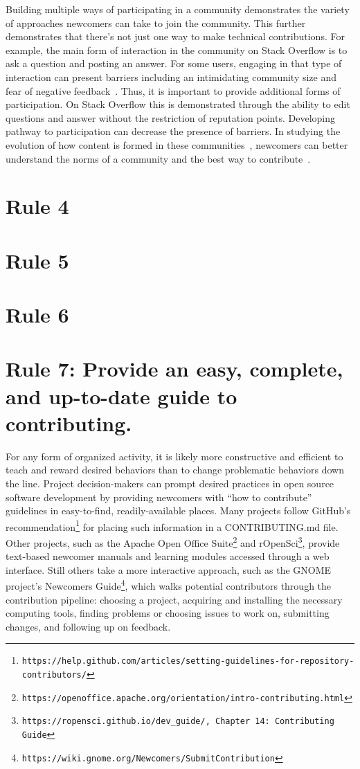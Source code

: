 \documentclass[10pt,letterpaper]{article}
\newcommand{\rulemajor}[1]{\section{#1}}
\newcommand{\withurl}[2]{{#1}\footnote{{\texttt{#2}}}}
\begin{document}
Building multiple ways of participating in a community demonstrates the variety of approaches newcomers can take to join the community.
This further demonstrates that there’s not just one way to make technical contributions.
For example,
the main form of interaction in the community on Stack Overflow is to ask a question and posting an answer.
For some users, engaging in that type of interaction can present barriers including an intimidating community size and fear of negative feedback~\cite{ford2016}.
Thus, it is important to provide additional forms of participation.
On Stack Overflow this is demonstrated through the ability to edit questions and answer without the restriction of reputation points.
Developing pathway to participation can decrease the presence of barriers.
In studying the evolution of how content is formed in these communities~\cite{baltes2018},
newcomers can better understand the norms of a community and the best way to contribute~\cite{ford2018}.

\rulemajor{Rule 4}

\rulemajor{Rule 5}

\rulemajor{Rule 6}

\rulemajor{Rule 7: Provide an easy, complete, and up-to-date guide to contributing.}

For any form of organized activity,
it is likely more constructive and efficient to teach and reward desired behaviors
than to change problematic behaviors down the line.
Project decision-makers can prompt desired practices in open source software development
by providing newcomers with ``how to contribute'' guidelines in easy-to-find, readily-available places.
Many projects follow \withurl{GitHub's recommendation}{https://help.github.com/articles/setting-guidelines-for-repository-contributors/}
for placing such information in a CONTRIBUTING.md file.
Other projects,
such as the \withurl{Apache Open Office Suite}{https://openoffice.apache.org/orientation/intro-contributing.html}
and \withurl{rOpenSci}{https://ropensci.github.io/dev\_guide/, Chapter 14: Contributing Guide},
provide text-based newcomer manuals and learning modules accessed through a web interface.
Still others take a more interactive approach,
such as the \withurl{GNOME project's Newcomers Guide}{https://wiki.gnome.org/Newcomers/SubmitContribution},
which walks potential contributors through the contribution pipeline:
choosing a project,
acquiring and installing the necessary computing tools,
finding problems or choosing issues to work on,
submitting changes,
and following up on feedback.
\end{document}
